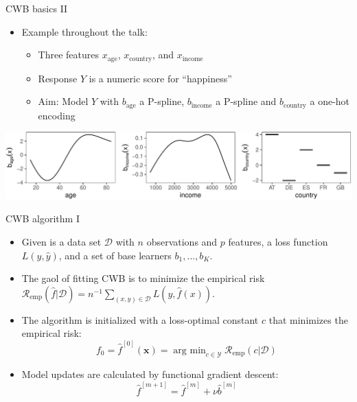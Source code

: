 \documentclass[ignorenonframetext,]{beamer}
\providecommand{\tightlist}{%
  \setlength{\itemsep}{0pt}\setlength{\parskip}{0pt}}
\newcommand{\D}{\mathcal{D}}
\newcommand{\fh}{\hat{f}}
\newcommand{\fmh}{\fh^{[m]}}
\newcommand{\blK}{K}
\newcommand{\xv}{\bm{x}}
\newcommand{\argmin}{\operatorname{arg~min}}
\newcommand{\riske}{\mathcal{R}_{\text{emp}}}
\begin{document}
\begin{frame}{CWB basics II}
\protect\hypertarget{cwb-basics-ii}{}
\begin{itemize}
\tightlist
\item
  Example throughout the talk:

  \begin{itemize}
  \tightlist
  \item
    Three features \(x_{\text{age}}\), \(x_{\text{country}}\), and
    \(x_{\text{income}}\)
  \item
    Response \(Y\) is a numeric score for ``happiness''
  \item
    Aim: Model \(Y\) with \(b_{\text{age}}\) a P-spline,
    \(b_{\text{income}}\) a P-spline and \(b_{\text{country}}\) a
    one-hot encoding
  \end{itemize}
\end{itemize}

\begin{center}\includegraphics{figures/unnamed-chunk-1-1} \end{center}
\end{frame}

\begin{frame}{CWB algorithm I}
\protect\hypertarget{cwb-algorithm-i}{}
\begin{itemize}
\tightlist
\item
  Given is a data set \(\D\) with \(n\) observations and \(p\) features,
  a loss function \(L(y, \hat{y})\), and a set of base learners
  \(b_1, \dots, b_\blK\).
\item
  The gaol of fitting CWB is to minimize the empirical risk
  \(\riske(\fh | \D) = n^{-1}\sum_{(x,y)\in\D} L(y, \fh(x))\).
\item
  The algorithm is initialized with a loss-optimal constant \(c\) that
  minimizes the empirical risk:
  \[f_0 = \fh^{[0]}(\xv) = \argmin_{c\in\mathcal{Y}}\riske(c|\D)\]
\item
  Model updates are calculated by functional gradient descent:
  \[\fh^{[m+1]} = \fmh + \nu \hat{b}^{[m]}\]
\end{itemize}
\end{frame}
\end{document}
